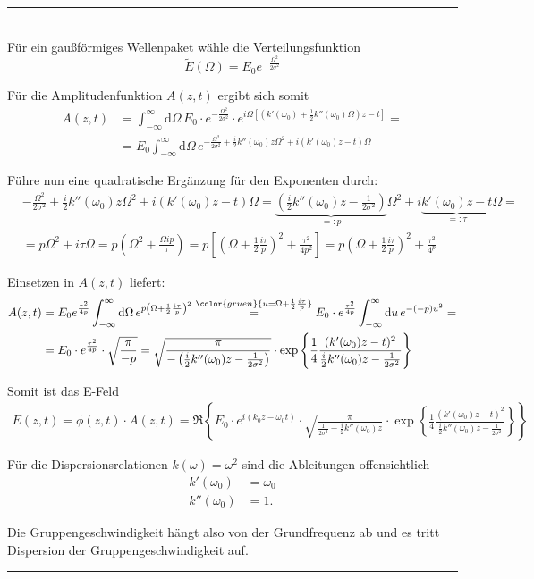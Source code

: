 \documentclass{article}
\newcommand{\diff}{\mathrm{d}}
\newcommand{\lr}[1]{\left(#1\right)}
\newcommand{\lreck}[1]{\left[#1\right]}
\newcommand{\lrschweif}[1]{\left\{#1\right\}}
\newcommand{\comment}[1]{{\color{gruen} {#1}}}
\begin{document}
{\color{blue}
\hrule
	\\
	Für ein gaußförmiges Wellenpaket wähle die Verteilungsfunktion
		$$\tilde{E}(\Omega) = E_0 e^{-\frac{\Omega^2}{2\sigma^2}}$$
	
	Für die Amplitudenfunktion $A(z,t)$ ergibt sich somit
		\begin{align*}
			A(z,t) &= \int_{-\infty}^{\infty} \diff\Omega\, E_0 \cdot e^{-\frac{\Omega^2}{2\sigma^2}} \cdot e^{i\Omega \lreck{ \lr{ k'(\omega_0) + \frac{1}{2}k''(\omega_0) \Omega } z - t } } = \\
			&= E_0 \int_{-\infty}^{\infty} \diff\Omega\, e^{-\frac{\Omega^2}{2\sigma^2} + \frac{i}{2}k''(\omega_0) z \Omega^2 + i(k'(\omega_0)z - t)\Omega}
		\end{align*}

	Führe nun eine quadratische Ergänzung für den Exponenten durch:
		\begin{align*}
			&-\frac{\Omega^2}{2\sigma^2} + \frac{i}{2}k''(\omega_0) z \Omega^2 + i(k'(\omega_0)z - t)\Omega = \underbrace{\lr{ \frac{i}{2}k''(\omega_0)z - \frac{1}{2\sigma^2} } }_{=:p} \Omega^2 + i \underbrace{k'(\omega_0)z - t}_{=:\tau} \Omega = \\
			&= p\Omega^2 + i\tau\Omega = p \lr{ \Omega^2 + \frac{\Omega i p}{\tau} } = p \lreck{ \lr{ \Omega + \frac{1}{2}\frac{i\tau}{p} }^2 + \frac{\tau^2}{4p^2} } = p \lr{ \Omega + \frac{1}{2}\frac{i\tau}{p} }^2 + \frac{\tau^2}{4^p}
		\end{align*}

	Einsetzen in $A(z,t)$ liefert:
		\begin{align*}
			A(z,t) &= E_0 e^{\frac{\tau^2}{4p}} \int_{-\infty}^\infty \diff\Omega \, e^{p \lr{ \Omega + \frac{1}{2}\frac{i\tau}{p} }^2} \stackrel{\comment{u = \Omega + \frac{1}{2}\frac{i\tau}{p}}}{=} E_0 \cdot e^{\frac{\tau^2}{4p}} \int_{-\infty}^\infty \diff u \, e^{-(-p)u^2} = \\
			&= E_0 \cdot e^{\frac{\tau^2}{4p}} \cdot \sqrt{\frac{\pi}{-p}} = \sqrt{\frac{\pi}{-\lr{ \frac{i}{2}k''(\omega_0) z - \frac{1}{2\sigma^2} }}} \cdot \exp\lrschweif{ \frac{1}{4} \frac{ (k'(\omega_0) z - t)^2 }{ \frac{i}{2}k''(\omega_0)z - \frac{1}{2\sigma^2} } }
		\end{align*}

	Somit ist das E-Feld
		\begin{align*}
			E(z,t) = \phi(z,t) \cdot A(z,t) = \Re \lrschweif{ E_0\cdot e^{i(k_0 z - \omega_0 t)} \cdot \sqrt{\frac{\pi}{ \frac{1}{2\sigma^2} - \frac{i}{2}k''(\omega_0) z }} \cdot \exp\lrschweif{ \frac{1}{4} \frac{ (k'(\omega_0) z - t)^2 }{ \frac{i}{2}k''(\omega_0)z - \frac{1}{2\sigma^2} } } }
		\end{align*}
	
	Für die Dispersionsrelationen $k(\omega) = \omega^2$ sind die Ableitungen offensichtlich
		\begin{align*}
			k'(\omega_0) &= \omega_0 \\
			k''(\omega_0) &= 1.
		\end{align*}
	
	Die Gruppengeschwindigkeit hängt also von der Grundfrequenz ab und es tritt Dispersion der Gruppengeschwindigkeit auf.
\hrule
}
\end{document}
